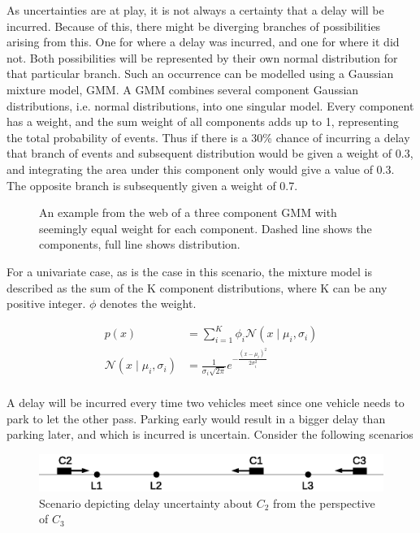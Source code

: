 \documentclass{article}
\begin{document}
		As uncertainties are at play, it is not always a certainty that a delay will be incurred. Because of this, there might be diverging branches of possibilities arising from this. One for where a delay was incurred, and one for where it did not. Both possibilities will be represented by their own normal distribution for that particular branch. Such an occurrence can be modelled using a Gaussian mixture model, GMM. A GMM combines several component Gaussian distributions, i.e. normal distributions, into one singular model. Every component has a weight, and the sum weight of all components adds up to 1, representing the total probability of events. Thus if there is a 30\% chance of incurring a delay that branch of events and subsequent distribution would be given a weight of 0.3, and integrating the area under this component only would give a value of 0.3. The opposite branch is subsequently given a weight of 0.7.

			\begin{figure}[H]
				
				\caption{An example from the web \cite{GMMImage} of a three component GMM with seemingly equal weight for each component. Dashed line shows the components, full line shows distribution.}
				\label{fig:GMM}
			\end{figure}

			For a univariate case, as is the case in this scenario, the mixture model is described as the sum of the K component distributions, where K can be any positive integer. $\phi$ denotes the weight.

			\begin{align}
				p(x) &= \sum_{i=1}^K\phi_i \mathcal{N}(x \;|\; \mu_i, \sigma_i)\\
				\mathcal{N}(x \;|\; \mu_i, \sigma_i) &= \frac{1}{\sigma_i\sqrt{2\pi}}e^{-\frac{(x-\mu_i)^2}{2\sigma_i^2}}\\
			\end{align}

			A delay will be incurred every time two vehicles meet since one vehicle needs to park to let the other pass. Parking early would result in a bigger delay than parking later, and which is incurred is uncertain. Consider the following scenarios

			\begin{figure}[H]
				\includegraphics[scale=0.8]{delayProbability.eps}
				\caption{Scenario depicting delay uncertainty about $C_2$ from the perspective of $C_3$}
				\label{fig:delayProbability}
			\end{figure}
\end{document}
